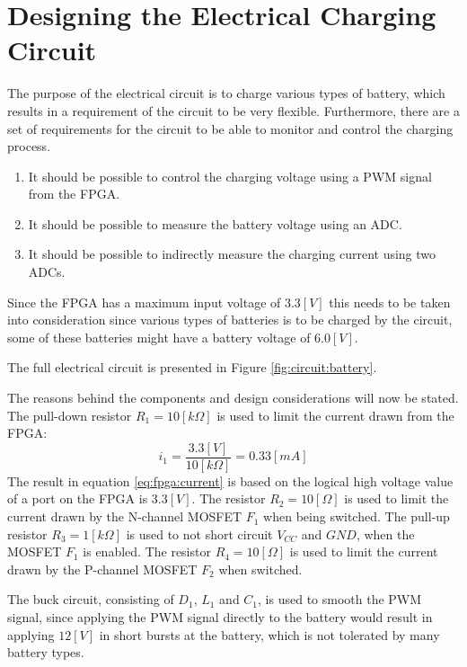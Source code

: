 \documentclass[../report.tex]{subfiles}
\begin{document}
\section{Designing the Electrical Charging Circuit}
\label{sec:circuit}
The purpose of the electrical circuit is to charge various types of battery, which results in a requirement of the circuit to be very flexible. Furthermore, there are a set of requirements for the circuit to be able to monitor and control the charging process.
\begin{enumerate}
    \item It should be possible to control the charging voltage using a PWM signal from the FPGA.
    \item It should be possible to measure the battery voltage using an ADC.
    \item It should be possible to indirectly measure the charging current using two ADCs.
\end{enumerate}
Since the FPGA has a maximum input voltage of $3.3 [V]$ this needs to be taken into consideration since various types of batteries is to be charged by the circuit, some of these batteries might have a battery voltage of $6.0 [V]$.

The full electrical circuit is presented in Figure \ref{fig:circuit:battery}.



The reasons behind the components and design considerations will now be stated.\\

The pull-down resistor $R_1 = 10[k\Omega]$ is used to limit the current drawn from the FPGA:
\begin{equation} \label{eq:fpga:current}
    i_1 = \frac{3.3[V]}{10[k\Omega]} = 0.33 [mA]
\end{equation}
The result in equation \ref{eq:fpga:current} is based on the logical high voltage value of a port on the FPGA is $3.3 [V]$.
The resistor $R_2 = 10 [\Omega]$ is used to limit the current drawn by the N-channel MOSFET $F_1$ when being switched.
The pull-up resistor $R_3 = 1 [k\Omega]$ is used to not short circuit $V_{CC}$ and $GND$, when the MOSFET $F_1$ is enabled. The resistor $R_4 = 10[\Omega]$ is used to limit the current drawn by the P-channel MOSFET $F_2$ when switched.

The buck circuit, consisting of $D_1$, $L_1$ and $C_1$, is used to smooth the PWM signal, since applying the PWM signal directly to the battery would result in applying $12 [V]$ in short bursts at the battery, which is not tolerated by many battery types.
\end{document}
